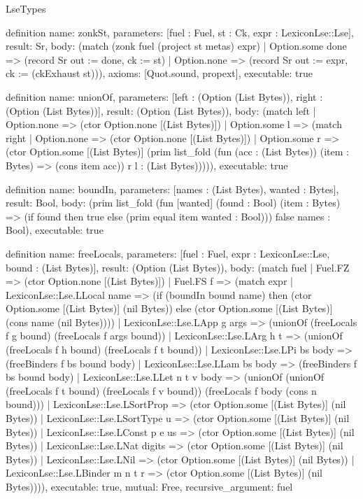 \begin{lexlean}{LseTypes}
\begin{semanticmodule}
definition{
  name: zonkSt,
  parameters: [fuel : Fuel, st : Ck, expr : LexiconLse::Lse],
  result: Sr,
  body: (match (zonk fuel (project st metas) expr)
    | Option.some done => (record Sr {out := done, ck := st})
    | Option.none => (record Sr {out := expr, ck := (ckExhaust st)})),
  axioms: [Quot.sound, propext],
  executable: true
}

definition{
  name: unionOf,
  parameters: [left : (Option (List Bytes)), right : (Option (List Bytes))],
  result: (Option (List Bytes)),
  body: (match left
    | Option.none => (ctor Option.none [(List Bytes)])
    | Option.some l => (match right
      | Option.none => (ctor Option.none [(List Bytes)])
      | Option.some r => (ctor Option.some [(List Bytes)] (prim list_fold (fun (acc : (List Bytes)) (item : Bytes) => (cons item acc)) r l : (List Bytes))))),
  executable: true
}

definition{
  name: boundIn,
  parameters: [names : (List Bytes), wanted : Bytes],
  result: Bool,
  body: (prim list_fold (fun [wanted] (found : Bool) (item : Bytes) => (if found then true else (prim equal item wanted : Bool))) false names : Bool),
  executable: true
}

definition{
  name: freeLocals,
  parameters: [fuel : Fuel, expr : LexiconLse::Lse, bound : (List Bytes)],
  result: (Option (List Bytes)),
  body: (match fuel
    | Fuel.FZ => (ctor Option.none [(List Bytes)])
    | Fuel.FS f => (match expr
      | LexiconLse::Lse.LLocal name => (if (boundIn bound name) then (ctor Option.some [(List Bytes)] (nil Bytes)) else (ctor Option.some [(List Bytes)] (cons name (nil Bytes))))
      | LexiconLse::Lse.LApp g args => (unionOf (freeLocals f g bound) (freeLocals f args bound))
      | LexiconLse::Lse.LArg h t => (unionOf (freeLocals f h bound) (freeLocals f t bound))
      | LexiconLse::Lse.LPi bs body => (freeBinders f bs bound body)
      | LexiconLse::Lse.LLam bs body => (freeBinders f bs bound body)
      | LexiconLse::Lse.LLet n t v body => (unionOf (unionOf (freeLocals f t bound) (freeLocals f v bound)) (freeLocals f body (cons n bound)))
      | LexiconLse::Lse.LSortProp => (ctor Option.some [(List Bytes)] (nil Bytes))
      | LexiconLse::Lse.LSortType u => (ctor Option.some [(List Bytes)] (nil Bytes))
      | LexiconLse::Lse.LConst p e us => (ctor Option.some [(List Bytes)] (nil Bytes))
      | LexiconLse::Lse.LNat digits => (ctor Option.some [(List Bytes)] (nil Bytes))
      | LexiconLse::Lse.LNil => (ctor Option.some [(List Bytes)] (nil Bytes))
      | LexiconLse::Lse.LBinder m n t r => (ctor Option.some [(List Bytes)] (nil Bytes)))),
  executable: true,
  mutual: Free,
  recursive_argument: fuel
}


\end{semanticmodule}
\end{lexlean}
